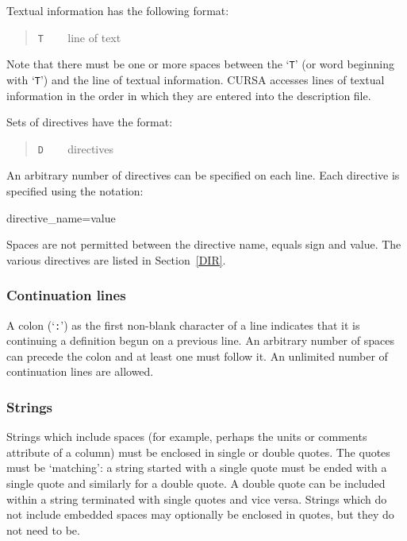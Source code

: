 \documentclass[twoside,11pt]{starlink}
\begin{document}
Textual information has the following format:

\begin{quote}
\texttt{T} ~~~ line of text
\end{quote}

Note that there must be one or more spaces between the `\texttt{T}' (or
word beginning with `\texttt{T}') and the line of textual information.
CURSA accesses lines of textual information in the order in which
they are entered into the description file.

Sets of directives have the format:

\begin{quote}
\texttt{D} ~~~ directives
\end{quote}

An arbitrary number of directives can be specified on each line.  Each
directive is specified using the notation:

\begin{terminalv}
directive_name=value
\end{terminalv}

Spaces are not permitted between the directive name, equals sign and
value.  The various directives are listed in Section~\ref{DIR}.

\subsubsection{Continuation lines}

A colon (`\texttt{:}') as the first non-blank character of a line indicates
that it is continuing a definition begun on a previous line.  An
arbitrary number of spaces can precede the colon and at least one
must follow it.  An unlimited number of continuation lines are allowed.

\subsubsection{Strings}

Strings which include spaces (for example, perhaps the units or comments
attribute of a column) must be enclosed in single or double quotes.  The
quotes must be `matching': a string started with a single quote must be
ended with a single quote and similarly for a double quote.  A double quote
can be included within a string terminated with single quotes and vice
versa.  Strings which do not include embedded spaces may optionally be
enclosed in quotes, but they do not need to be.
\end{document}
